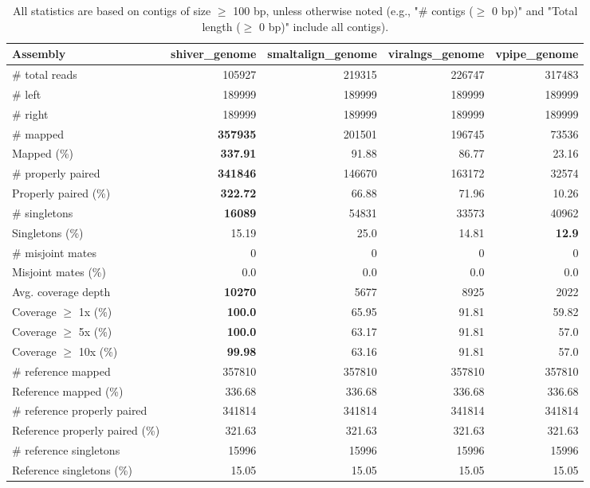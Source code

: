 \documentclass[12pt,a4paper]{article}
\begin{document}
\begin{table}[ht]
\begin{center}
\caption{All statistics are based on contigs of size $\geq$ 100 bp, unless otherwise noted (e.g., "\# contigs ($\geq$ 0 bp)" and "Total length ($\geq$ 0 bp)" include all contigs).}
\begin{tabular}{|l*{4}{|r}|}
\hline
Assembly & shiver\_genome & smaltalign\_genome & viralngs\_genome & vpipe\_genome \\ \hline
\# total reads & 105927 & 219315 & 226747 & 317483 \\ \hline
\# left & 189999 & 189999 & 189999 & 189999 \\ \hline
\# right & 189999 & 189999 & 189999 & 189999 \\ \hline
\# mapped & {\bf 357935} & 201501 & 196745 & 73536 \\ \hline
Mapped (\%) & {\bf 337.91} & 91.88 & 86.77 & 23.16 \\ \hline
\# properly paired & {\bf 341846} & 146670 & 163172 & 32574 \\ \hline
Properly paired (\%) & {\bf 322.72} & 66.88 & 71.96 & 10.26 \\ \hline
\# singletons & {\bf 16089} & 54831 & 33573 & 40962 \\ \hline
Singletons (\%) & 15.19 & 25.0 & 14.81 & {\bf 12.9} \\ \hline
\# misjoint mates & 0 & 0 & 0 & 0 \\ \hline
Misjoint mates (\%) & 0.0 & 0.0 & 0.0 & 0.0 \\ \hline
Avg. coverage depth & {\bf 10270} & 5677 & 8925 & 2022 \\ \hline
Coverage $\geq$ 1x (\%) & {\bf 100.0} & 65.95 & 91.81 & 59.82 \\ \hline
Coverage $\geq$ 5x (\%) & {\bf 100.0} & 63.17 & 91.81 & 57.0 \\ \hline
Coverage $\geq$ 10x (\%) & {\bf 99.98} & 63.16 & 91.81 & 57.0 \\ \hline
\# reference mapped & 357810 & 357810 & 357810 & 357810 \\ \hline
Reference mapped (\%) & 336.68 & 336.68 & 336.68 & 336.68 \\ \hline
\# reference properly paired & 341814 & 341814 & 341814 & 341814 \\ \hline
Reference properly paired (\%) & 321.63 & 321.63 & 321.63 & 321.63 \\ \hline
\# reference singletons & 15996 & 15996 & 15996 & 15996 \\ \hline
Reference singletons (\%) & 15.05 & 15.05 & 15.05 & 15.05 \\ \hline

\end{tabular}
\end{center}
\end{table}
\end{document}
